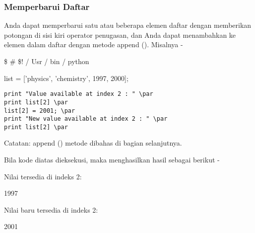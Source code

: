 \subsubsection{Memperbarui Daftar}
\vspace{12pt}
Anda dapat memperbarui satu atau beberapa elemen daftar dengan memberikan potongan di sisi kiri operator penugasan, dan Anda dapat menambahkan ke elemen dalam daftar dengan metode append (). Misalnya - \par
\vspace{12pt}
 \$  \#  \$! / Usr / bin / python \par
\vspace{12pt}
list = ['physics', 'chemistry', 1997, 2000]; \par
\vspace{12pt}
\begin{verbatim}
print "Value available at index 2 : " \par
print list[2] \par
list[2] = 2001; \par
print "New value available at index 2 : " \par
print list[2] \par
\end{verbatim}
Catatan: append () metode dibahas di bagian selanjutnya. \par
\vspace{12pt}
Bila kode diatas dieksekusi, maka menghasilkan hasil sebagai berikut - \par
Nilai tersedia di indeks 2: \par
\vspace{12pt}
1997 \par
\vspace{12pt}
Nilai baru tersedia di indeks 2: \par
\vspace{12pt}
2001 \par
\vspace{12pt}
